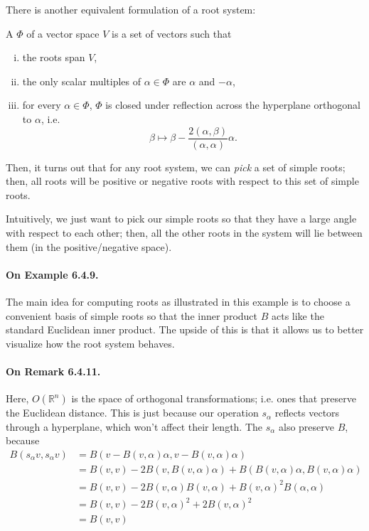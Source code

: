 \documentclass[oneside]{scrbook}
\begin{document}
There is another equivalent formulation of a root system:

\begin{definition}
A  $\Phi$ of a vector space $V$ is a set of vectors such that
\begin{enumerate}[(i)]
    \item the roots span $V$,
    \item the only scalar multiples of $\alpha\in\Phi$ are $\alpha$ and $-\alpha$,
    \item for every $\alpha\in\Phi$, $\Phi$ is closed under reflection across the hyperplane orthogonal to $\alpha$, i.e.
    \[\beta\mapsto \beta-\frac{2(\alpha,\beta)}{(\alpha,\alpha)}\alpha.\]
\end{enumerate}
\end{definition}

Then, it turns out that for any root system, we can \textit{pick} a set of simple roots; then, all roots will be positive or negative roots with respect to this set of simple roots.

Intuitively, we just want to pick our simple roots so that they have a large angle with respect to each other; then, all the other roots in the system will lie between them (in the positive/negative space).

\paragraph{On Example 6.4.9.} The main idea for computing roots as illustrated in this example is to choose a convenient basis of simple roots so that the inner product $B$ acts like the standard Euclidean inner product. The upside of this is that it allows us to better visualize how the root system behaves. 

\paragraph{On Remark 6.4.11.} Here, $O(\mathbb{R}^n)$ is the space of orthogonal transformations; i.e. ones that preserve the Euclidean distance. This is just because our operation $s_{\alpha}$ reflects vectors through a hyperplane, which won't affect their length. The $s_{\alpha}$ also preserve $B$, because
\begin{align*}
    B(s_{\alpha}v,s_{\alpha}v) &= B(v-B(v,\alpha)\alpha,v-B(v,\alpha)\alpha)\\
    &= B(v,v)-2B(v,B(v,\alpha)\alpha)+B(B(v,\alpha)\alpha,B(v,\alpha)\alpha)\\
    &= B(v,v)-2B(v,\alpha)B(v,\alpha)+B(v,\alpha)^2B(\alpha,\alpha)\\
    &= B(v,v)-2B(v,\alpha)^2+2B(v,\alpha)^2\\
    &= B(v,v)
\end{align*}
\end{document}
